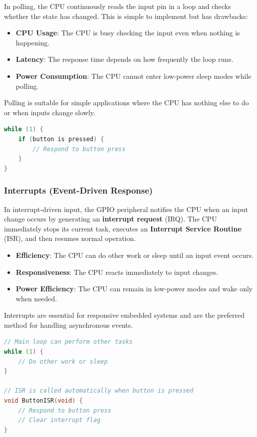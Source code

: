 In polling, the CPU continuously reads the input pin in a loop and checks whether the state has changed. This is simple to implement but has drawbacks:

\begin{itemize}[nosep]
  \item \textbf{CPU Usage}: The CPU is busy checking the input even when nothing is happening.
  \item \textbf{Latency}: The response time depends on how frequently the loop runs.
  \item \textbf{Power Consumption}: The CPU cannot enter low-power sleep modes while polling.
\end{itemize}

\noindent
Polling is suitable for simple applications where the CPU has nothing else to do or when inputs change slowly.

\begin{lstlisting}[caption={Polling Example (Conceptual)}, language=C]
while (1) {
    if (button is pressed) {
        // Respond to button press
    }
}
\end{lstlisting}

\subsubsection{Interrupts (Event-Driven Response)}

In interrupt-driven input, the GPIO peripheral notifies the CPU when an input change occurs by generating an \textbf{interrupt request} (IRQ). The CPU immediately stops its current task, executes an \textbf{Interrupt Service Routine} (ISR), and then resumes normal operation.

\begin{itemize}[nosep]
  \item \textbf{Efficiency}: The CPU can do other work or sleep until an input event occurs.
  \item \textbf{Responsiveness}: The CPU reacts immediately to input changes.
  \item \textbf{Power Efficiency}: The CPU can remain in low-power modes and wake only when needed.
\end{itemize}

\noindent
Interrupts are essential for responsive embedded systems and are the preferred method for handling asynchronous events.

\begin{lstlisting}[caption={Interrupt Example (Conceptual)}, language=C]
// Main loop can perform other tasks
while (1) {
    // Do other work or sleep
}

// ISR is called automatically when button is pressed
void ButtonISR(void) {
    // Respond to button press
    // Clear interrupt flag
}
\end{lstlisting}


